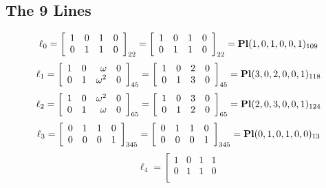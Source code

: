 \documentclass{article}
\begin{document}
{\subsection*{The 9 Lines}
$$
\ell_{0} = 
\left[
\begin{array}{*{4}{r}}
1 & 0 & 1 & 0\\
0 & 1 & 1 & 0\\
\end{array}
\right]
_{22}
=
\left[
\begin{array}{*{4}c}
1  & 0  & 1  & 0\\
0  & 1  & 1  & 0\\
\end{array}
\right]_{22}
={\rm\bf Pl}(1,0,1,0,0,1 )_{109}$$
$$
\ell_{1} = 
\left[
\begin{array}{*{4}{r}}
1 & 0 & \omega  & 0\\
0 & 1 & \omega^{2} & 0\\
\end{array}
\right]
_{45}
=
\left[
\begin{array}{*{4}c}
1  & 0  & 2  & 0\\
0  & 1  & 3  & 0\\
\end{array}
\right]_{45}
={\rm\bf Pl}(3,0,2,0,0,1 )_{118}$$
$$
\ell_{2} = 
\left[
\begin{array}{*{4}{r}}
1 & 0 & \omega^{2} & 0\\
0 & 1 & \omega  & 0\\
\end{array}
\right]
_{65}
=
\left[
\begin{array}{*{4}c}
1  & 0  & 3  & 0\\
0  & 1  & 2  & 0\\
\end{array}
\right]_{65}
={\rm\bf Pl}(2,0,3,0,0,1 )_{124}$$
$$
\ell_{3} = 
\left[
\begin{array}{*{4}{r}}
0 & 1 & 1 & 0\\
0 & 0 & 0 & 1\\
\end{array}
\right]
_{345}
=
\left[
\begin{array}{*{4}c}
0  & 1  & 1  & 0\\
0  & 0  & 0  & 1\\
\end{array}
\right]_{345}
={\rm\bf Pl}(0,1,0,1,0,0 )_{13}$$
$$
\ell_{4} = 
\left[
\begin{array}{*{4}{r}}
1 & 0 & 1 & 1\\
0 & 1 & 1 & 0\\

\end{array}$$}
\end{document}
